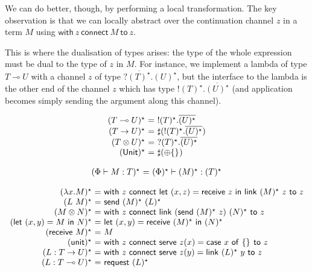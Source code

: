 \documentclass{easychair}
\makeatletter
\newcommand{\ba}{\begin{array}}
\newcommand{\ea}{\end{array}}
\newenvironment{equations}{\[\ba{@{}r@{~}c@{~}l@{}}}{\ea\]}
\newcommand{\key}{\mathsf}
\newcommand{\set}[1]{\{ #1 \}}
\newcommand{\row}[2]{\set{#1}_{#2}}
\newcommand{\gvOutput}[2]{\mathord{!}{#1}.{#2}}
\newcommand{\gvInput}[2]{\mathord{?}{#1}.{#2}}
\newcommand{\gvPlus}[2]{\oplus \row{#1}{#2}}
\newcommand{\gvService}[1]{\sharp {#1}}
\newcommand{\gvDual}[1]{\overline{#1}}
\newcommand{\gvj}[3]{{#1} \vdash {#2} : {#3}}
\newcommand{\lolli}{\multimap}
\newcommand{\gvLinFun}[2]{{#1} \lolli {#2}}
\newcommand{\gvUnFun}[2]{{#1} \to {#2}}
\newcommand{\gvTimes}[2]{{#1} \otimes {#2}}
\newcommand{\gvUnitType}{\key{Unit}}
\newcommand{\gvUnit}{\key{unit}}
\newcommand{\gvLink}[2]{\key{link}~{#1}~{#2}}
\newcommand{\gvLam}[2]{\lambda {#1}.{#2}}
\newcommand{\gvApp}[2]{{#1}~{#2}}
\newcommand{\gvPair}[2]{({#1},{#2})}
\newcommand{\gvLet}[3]{\key{let}~{#1}={#2}~\key{in}~{#3}}
\newcommand{\gvSend}[2]{\key{send}~{#1}~{#2}}
\newcommand{\gvReceive}[1]{\key{receive}~{#1}}
\newcommand{\gvCase}[2]{\key{case}~{#1}~\key{of}~{#2}}
\newcommand{\gvWith}[3]{\key{with}~{#1}~\key{connect}~{#2}~\key{to}~{#3}}
\newcommand{\gvServeOld}[3]{\key{serve}~{#1}({#2})={#3}}
\newcommand{\gvRequest}[1]{\key{request}~{#1}}
\makeatother
\begin{document}
\newcommand{\gvtogv}[1]{({#1})^\star}

We can do better, though, by performing a local transformation. The
key observation is that we can locally abstract over the continuation
channel $z$ in a term $M$ using $\gvWith{z}{M}{z}$.

This is where the dualisation of types arises: the type of the whole
expression must be dual to the type of $z$ in $M$. For instance, we
implement a lambda of type $\gvLinFun{T}{U}$ with a channel $z$ of
type $\gvInput{\gvDual{\gvtogv{T}}}{\gvtogv{U}}$, but the interface to
the lambda is the other end of the channel $z$ which has type
$\gvOutput{\gvtogv{T}}{\gvDual{\gvtogv{U}}}$ (and application becomes
simply sending the argument along this channel).

\begin{equations}
\gvtogv{\gvLinFun{T}{U}} &=& \gvOutput{\gvtogv{T}}{\gvDual{\gvtogv{U}}} \\
\gvtogv{\gvUnFun{T}{U}} &=& \gvService{(\gvOutput{\gvtogv{T}}{\gvDual{\gvtogv{U}}})} \\
\gvtogv{\gvTimes{T}{U}} &=& \gvInput{\gvtogv{T}}{\gvDual{\gvtogv{U}}} \\
\gvtogv{\gvUnitType} &=& \gvService{(\gvPlus{}{})} \\
\end{equations}%

\begin{equations}
\gvtogv{\gvj{\Phi}{M}{T}} &=& \gvj{\gvtogv{\Phi}}{\gvtogv{M}}{\gvtogv{T}} \\
\end{equations}%

\begin{equations}
\gvtogv{\gvLam{x}{M}} &=& \gvWith{z}{\gvLet{\gvPair{x}{z}}{\gvReceive{z}}{\gvLink{\gvtogv{M}}{z}}}{z} \\
\gvtogv{\gvApp{L}{M}} &=& \gvSend{\gvtogv{M}}{\gvtogv{L}} \\
\gvtogv{\gvTimes{M}{N}} &=&
  \gvWith{z}
    {\gvLink{(\gvSend{\gvtogv{M}}{z})}{\gvtogv{N}}}
    {z} \\
\gvtogv{\gvLet{\gvPair{x}{y}}{M}{N}} &=&
    \gvLet{\gvPair{x}{y}}{\gvReceive{\gvtogv{M}}}{\gvtogv{N}} \\
\gvtogv{\gvReceive{M}} &=& M \\
\gvtogv{\gvUnit} &=&
    \gvWith{z}
    {\gvServeOld{z}{x}{\gvCase{x}{\row{}{}}}}
    {z} \\
\gvtogv{L : \gvUnFun{T}{U}} &=&
  \gvWith{z}{\gvServeOld{z}{y}{\gvLink{\gvtogv{L}}{y}}}{z} \\
\gvtogv{L : \gvLinFun{T}{U}} &=& \gvRequest{\gvtogv{L}} \\
\end{equations}
\end{document}
